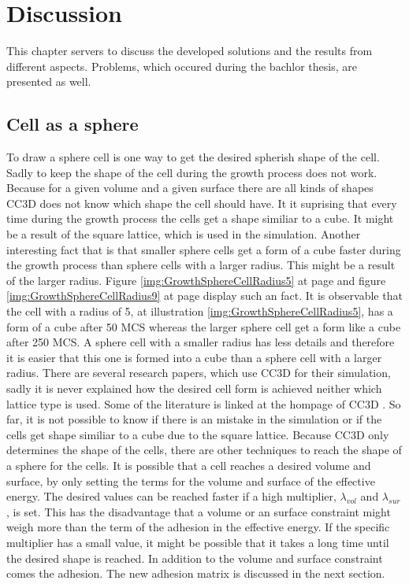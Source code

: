 \chapter{Discussion}
This chapter servers to discuss the developed solutions and the results from different aspects. Problems, which occured during the bachlor thesis, are presented as well.

\section{Cell as a sphere}
To draw a sphere cell is one way to get the desired spherish shape of the cell. Sadly to keep the shape of the cell during the growth process does not work. Because for a given volume and a given surface there are all kinds of shapes \ac{CC3D} does not know which shape the cell should have. It it suprising that every time during the growth process the cells get a shape similiar to a cube. It might be a result of the square lattice, which is used in the simulation. Another interesting fact that is that smaller sphere cells get a form of a cube faster during the growth process than sphere cells with a larger radius. This might be a result of the larger radius. Figure \ref{img:GrowthSphereCellRadius5} at page \pageref{img:GrowthSphereCellRadius5} and figure \ref{img:GrowthSphereCellRadius9} at page \pageref{img:GrowthSphereCellRadius9} display such an fact. It is observable that the cell with a radius of 5, at illustration \ref{img:GrowthSphereCellRadius5}, has a form of a cube after 50 \ac{MCS} whereas the larger sphere cell get a form like a cube after 250 \ac{MCS}. A sphere cell with a smaller radius has less details and therefore it is easier that this one is formed into a cube than a sphere cell with a larger radius. \newline
There are several research papers, which use \ac{CC3D} for their simulation, sadly it is never explained how the desired cell form is achieved neither which lattice type is used. Some of the literature is linked at the hompage of \ac{CC3D} \cite{CC3D.org}. So far, it is not possible to know if there is an mistake in the simulation or if the cells get shape similiar to a cube due to the square lattice. \newline
Because \ac{CC3D} only determines the shape of the cells, there are other techniques to reach the shape of a sphere for the cells. It is possible that a cell reaches a desired volume and surface, by only setting the terms for the volume and surface of the effective energy. The desired values can be reached faster if a high multiplier, $\lambda_{vol}$ and $\lambda_{sur}$, is set. This has the disadvantage that a volume or an surface constraint might weigh more than the term of the adhesion in the effective energy. If the specific multiplier has a small value, it might be possible that it takes a long time until the desired shape is reached. In addition to the volume and surface constraint comes the adhesion. The new adhesion matrix is discussed in the next section.

